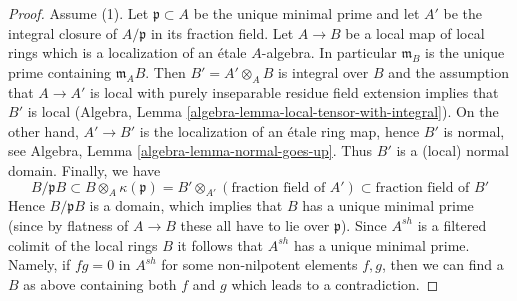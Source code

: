 \documentclass[10pt,a4paper]{amsart}
\theoremstyle{plain}
\theoremstyle{definition}
\theoremstyle{remark}
\numberwithin{equation}{subsection}
\begin{document}
\begin{proof}
\medskip\noindent
Assume (1). Let $\mathfrak p \subset A$ be the unique minimal
prime and let $A'$ be the integral closure of $A/\mathfrak p$
in its fraction field. Let $A \to B$ be a local map of local rings which is a
localization of an \'etale $A$-algebra. In particular $\mathfrak m_B$
is the unique prime containing $\mathfrak m_AB$. Then $B' = A' \otimes_A B$
is integral over $B$ and the assumption that $A \to A'$ is local
with purely inseparable residue field extension implies that $B'$
is local (Algebra, Lemma \ref{algebra-lemma-local-tensor-with-integral}).
On the other hand, $A' \to B'$ is the localization
of an \'etale ring map, hence $B'$ is normal, see
Algebra, Lemma \ref{algebra-lemma-normal-goes-up}.
Thus $B'$ is a (local) normal domain. Finally, we have
$$
B/\mathfrak pB \subset B \otimes_A \kappa(\mathfrak p)
= B' \otimes_{A'} (\text{fraction field of }A') \subset
\text{fraction field of }B'
$$
Hence $B/\mathfrak pB$ is a domain, which implies that $B$ has a unique
minimal prime (since by flatness of $A \to B$ these all have to lie
over $\mathfrak p$). Since $A^{sh}$ is a filtered colimit of
the local rings $B$ it follows that $A^{sh}$ has a unique minimal prime.
Namely, if $fg = 0$ in $A^{sh}$ for some non-nilpotent elements
$f, g$, then we can find a $B$ as above containing both $f$ and $g$
which leads to a contradiction.
\end{proof}
\end{document}
